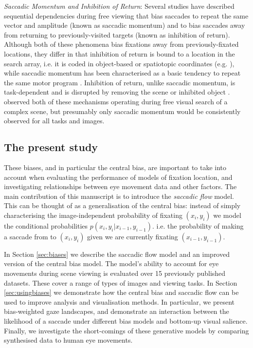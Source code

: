 \textit{Saccadic Momentum and Inhibition of Return}: Several studies have described sequential dependencies during free viewing that bias saccades to repeat the same vector and amplitude (known as saccadic momentum) and to bias saccades away from returning to previously-visited targets (known as inhibition of return). Although both of these phenomena bias fixations away from previously-fixated locations, they differ in that inhibition of return is bound to a location in the search array, i.e. it is coded in object-based or spatiotopic coordinates (e.g. \cite{krueger-hunt2013}), while saccadic momentum has been characterised as a basic tendency to repeat the same motor program \citep{wang2011}. Inhibition of return, unlike saccadic momentum, is task-dependent \citep{dodd2009} and is disrupted by removing the scene or inhibited object  \citep{klein-macinnes1999, takeda-yagi2000}.  \cite{macinnes2014} observed both of these mechanisms operating during free visual search of a complex scene, but presumably only saccadic momentum would be consistently observed for all tasks and images. 

\subsection{The present study}

These biases, and in particular the central bias, are important to take into account when evaluating the performance of models of fixation location, and investigating relationships between eye movement data and other factors. The main contribution of this manuscript is to introduce the \textit{saccadic flow} model. This can be thought of as a generalisation of the central bias: instead of simply characterising the image-independent probability of fixating $(x_i, y_i)$ we model the conditional probabilities $p(x_i,y_i|x_{i-1}, y_{i-1})$. i.e. the probability of making a saccade from to $(x_i,y_i)$ given we are currently fixating $(x_{i-1}, y_{i-1})$.

In Section \ref{sec:biases} we describe the saccadic flow model and an improved version of the central bias model. The model's ability to account for eye movements during scene viewing is evaluated over 15 previously published datasets. These cover a range of types of images and viewing tasks. In Section \ref{sec:usingbiases} we demonstrate how the central bias and saccadic flow can be used to improve analysis and visualisation methods. In particular, we present bias-weighted gaze landscapes, and demonstrate an interaction between the likelihood of a saccade under different bias models and bottom-up visual salience. Finally, we investigate the short-comings of these generative models by comparing synthesised data to human eye movements. 
